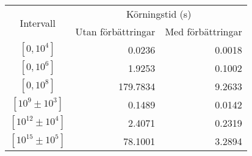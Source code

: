 \renewcommand{\arraystretch}{1.3} %


\begin{tabular}{|c||r|r|}
    \hline
    \multirow{2}{*}{\ Intervall\ } & \multicolumn{2}{c|}{Körningstid (s)}\\
    \cline{2-3}
    & Utan förbättringar & Med förbättringar\\
    \hline
    $\left[0,10^{4}\right]$ & 0.0236   & 0.0018\\
    $\left[0,10^{6}\right]$ & 1.9253   & 0.1002\\
    $\left[0,10^{8}\right]$ & 179.7834 & 9.2633\\
    \hline
    $\left[10^{9}  \pm 10^{3}\right]$  & 0.1489  & 0.0142\\
    $\left[10^{12} \pm 10^{4}\right]$  & 2.4071  & 0.2319\\
    $\left[10^{15} \pm 10^{5}\right]$  & 78.1001 & 3.2894\\
    \hline
\end{tabular}
